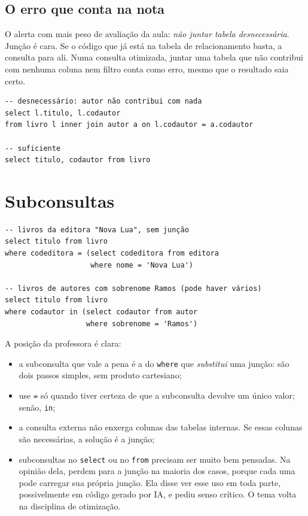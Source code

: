 \subsection{O erro que conta na nota}

O alerta com mais peso de avaliação da aula: \emph{não juntar tabela
desnecessária}. Junção é cara. Se o código que já está na tabela de
relacionamento basta, a consulta para ali. Numa consulta otimizada,
juntar uma tabela que não contribui com nenhuma coluna nem filtro conta
como erro, mesmo que o resultado saia certo.

\begin{lstlisting}
-- desnecessário: autor não contribui com nada
select l.titulo, l.codautor
from livro l inner join autor a on l.codautor = a.codautor

-- suficiente
select titulo, codautor from livro
\end{lstlisting}

\section{Subconsultas}

\begin{lstlisting}
-- livros da editora "Nova Lua", sem junção
select titulo from livro
where codeditora = (select codeditora from editora
                    where nome = 'Nova Lua')

-- livros de autores com sobrenome Ramos (pode haver vários)
select titulo from livro
where codautor in (select codautor from autor
                   where sobrenome = 'Ramos')
\end{lstlisting}

A posição da professora é clara:

\begin{itemize}
	\item a subconsulta que vale a pena é a do \texttt{where} que
	\emph{substitui} uma junção: são dois passos simples, sem produto
	cartesiano;
	\item use \texttt{=} só quando tiver certeza de que a subconsulta
	devolve um único valor; senão, \texttt{in};
	\item a consulta externa não enxerga colunas das tabelas internas. Se
	essas colunas são necessárias, a solução é a junção;
	\item subconsultas no \texttt{select} ou no \texttt{from} precisam ser
	muito bem pensadas. Na opinião dela, perdem para a junção na maioria
	dos casos, porque cada uma pode carregar sua própria junção. Ela
	disse ver esse uso em toda parte, possivelmente em código gerado por
	IA, e pediu senso crítico. O tema volta na disciplina de otimização.
\end{itemize}

